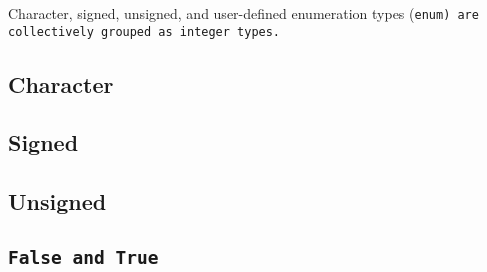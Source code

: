 \def\Subsection#1{\subsection{#1}}

Character, signed, unsigned, and user-defined enumeration
types (\tt{enum}) are collectively grouped as integer types.

\Subsection{Character}

\Subsection{Signed}

\Subsection{Unsigned}

\subsection{\tt{False} and \tt{True}}

